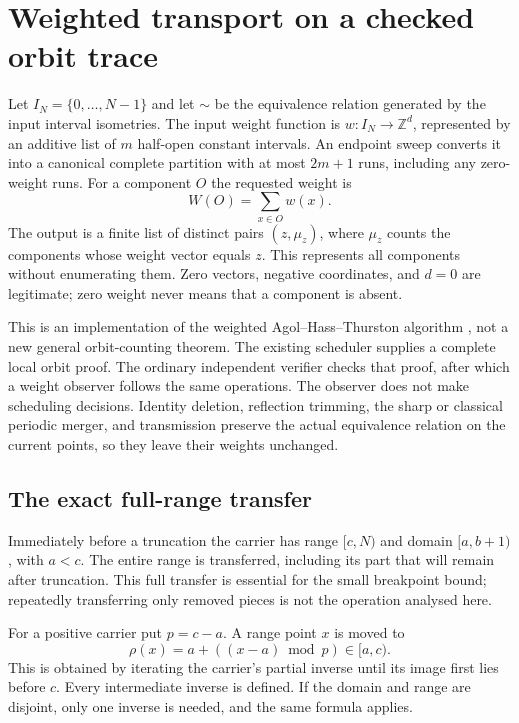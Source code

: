 \section{Weighted transport on a checked orbit trace}

Let $I_N=\{0,\ldots,N-1\}$ and let $\sim$ be the equivalence relation
generated by the input interval isometries. The input weight function is
$w:I_N\to\mathbb Z^d$, represented by an additive list of $m$ half-open
constant intervals. An endpoint sweep converts it into a canonical complete
partition with at most $2m+1$ runs, including any zero-weight runs. For a
component $O$ the requested weight is
\[
             W(O)=\sum_{x\in O}w(x).
\]
The output is a finite list of distinct pairs $(z,\mu_z)$, where $\mu_z$
counts the components whose weight vector equals $z$. This represents all
components without enumerating them. Zero vectors, negative coordinates,
and $d=0$ are legitimate; zero weight never means that a component is absent.

This is an implementation of the weighted Agol--Hass--Thurston algorithm
\cite[Section 6]{aht2006},
not a new general orbit-counting theorem. The existing scheduler supplies
a complete local orbit proof. The ordinary independent verifier checks
that proof, after which a weight observer follows the same operations.
The observer does not make scheduling decisions. Identity deletion,
reflection trimming, the sharp or classical periodic merger, and
transmission preserve the actual equivalence relation on the current
points, so they leave their weights unchanged.

\subsection{The exact full-range transfer}

Immediately before a truncation the carrier has range $[c,N)$ and domain
$[a,b+1)$, with $a<c$. The entire range is transferred, including its part
that will remain after truncation. This full transfer is essential for the
small breakpoint bound; repeatedly transferring only removed pieces is
not the operation analysed here.

For a positive carrier put $p=c-a$. A range point $x$ is moved to
\[
             \rho(x)=a+((x-a)\bmod p)\in[a,c).
\]
This is obtained by iterating the carrier's partial inverse until its image
first lies before $c$. Every intermediate inverse is defined. If the
domain and range are disjoint, only one inverse is needed, and the same
formula applies.

